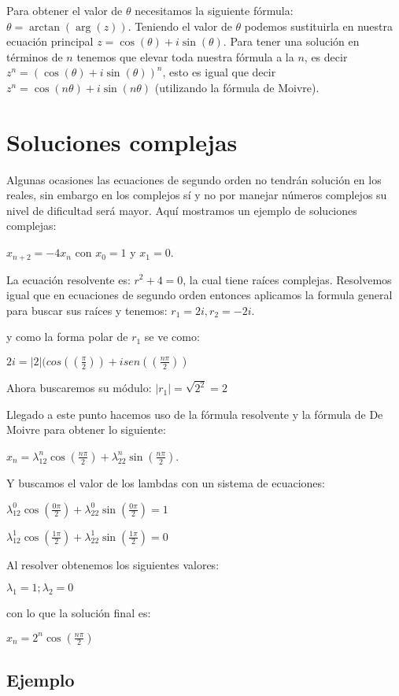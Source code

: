 \documentclass{report}
\begin{document}
Para obtener el valor de $\theta$
necesitamos la siguiente fórmula: $\theta=\arctan(\arg(z))$. Teniendo el
valor de $\theta$ podemos sustituirla en nuestra ecuación principal
$z=\cos(\theta)+i\sin(\theta)$. Para tener una solución en términos de
$n$ tenemos que elevar toda nuestra fórmula a la $n$, es decir
$z^n=(\cos(\theta)+i\sin(\theta))^n$, esto es igual que decir
$z^n=\cos(n\theta)+i\sin(n\theta)$ (utilizando la fórmula de Moivre).

\section{Soluciones complejas}
\label{sec:complejas}

Algunas ocasiones las ecuaciones de segundo orden no tendrán solución
en los reales, sin embargo en los complejos sí y no por manejar
números complejos su nivel de dificultad será mayor. Aquí mostramos un
ejemplo de soluciones complejas: 

$x_{n+2}=-4x_{n}$ con $x_0=1$ y $x_1=0$.

La ecuación resolvente es: $r^2+4=0$, la cual tiene raíces complejas.
Resolvemos igual que en ecuaciones de segundo orden entonces aplicamos
la formula general para buscar sus raíces y tenemos: $r_1=2i,r_2=-2i$.

y como la forma polar de $r_1$
se ve como:

$2i=|2|(cos((\frac{\pi}{2}))+isen((\frac{n\pi}{2}))$


Ahora buscaremos su módulo: $|r_{1}|=\sqrt{2^2}=2$

Llegado a este punto hacemos uso de la fórmula resolvente y la fórmula de De Moivre para obtener lo siguiente:

$x_n=\lambda_12^n\cos(\frac{n\pi}{2})+\lambda_22^n\sin(\frac{n\pi}{2})$.


Y buscamos el valor de los lambdas con un sistema de ecuaciones:

$\lambda_12^0\cos(\frac{0\pi}{2})+\lambda_22^0\sin(\frac{0\pi}{2})=1$

$\lambda_12^1\cos(\frac{1\pi}{2})+\lambda_22^1\sin(\frac{1\pi}{2})=0$

Al resolver obtenemos los siguientes valores:

$\lambda_1=1;\lambda_2=0$

con lo que la solución final es:

$x_n=2^n\cos(\frac{n\pi}{2})$
\bigskip
\bigskip
\subsection{Ejemplo}
\end{document}
